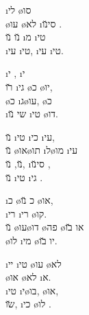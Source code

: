 
\begin{twocol}
\begin{stanza}
 \i{לי}  \o{סו} \\
\o{עו} \o{לא} \i{סי}\u{נו}  .\\
\u{נו} \u{נו} \i{מ} \i{טי}\\
\i{עי}  \i{טי}, \i{עי}  \i{טי}.
\end{stanza}

\begin{stanza}
\i{י} , \i{י} \\
\u{רו} \i{גי} \o{כ} \o{יו},\\
 \o{כ} \i{ג}\o{עו},  \o{כ} \\
\i{שי} \u{נו} \i{טי} \o{דו}.
\end{stanza}

\begin{stanza}
\u{נו} \i{טי} \i{כי} \i{עי},\\
\u{נו} \o{או}\o{תו} \i{ל}\o{מו} \i{עי}\\
\u{נו}, \u{נו}, \i{סי}\u{נו} ,\\
\u{נו} \i{טי} \i{גי} .
\end{stanza}

\begin{stanza}
\i{כ} \o{כ}  \u{נו} \o{או},\\
\i{רי}  \i{רי} \o{קו}.\\
\u{נו} \o{עו}\o{דו} \o{פה} \o{או} \u{בו}\\
\o{לו} \i{מי} \o{יו} \u{בו}.
\end{stanza}

\begin{stanza}
\i{יי} \i{טי} \o{עו} \o{לא} \\
  \o{או} \o{לא} \i{א}.\\
\i{טי} \i{י}\o{בו},   \o{או},\\
\u{שו}, \i{כי}   \o{לו}  .
\end{stanza}
\end{twocol}



